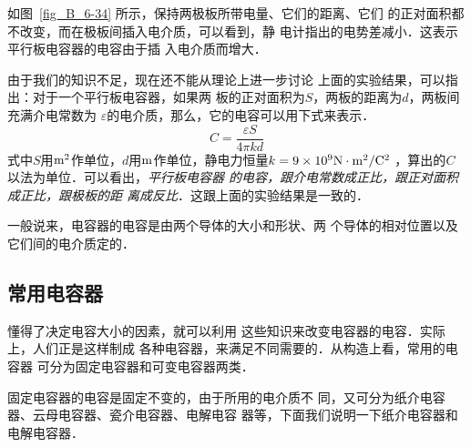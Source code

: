     如图~\ref{fig_B_6-34} 所示，保持两极板所带电量、它们的距离、它们
    的正对面积都不改变，而在极板间插入电介质，可以看到，静
    电计指出的电势差减小．这表示平行板电容器的电容由于插
    入电介质而增大．

    由于我们的知识不足，现在还不能从理论上进一步讨论
    上面的实验结果，可以指出：对于一个平行板电容器，如果两
    板的正对面积为$S$，两板的距离为$d$，两板间充满介电常数为
    $\varepsilon$的电介质，那么，它的电容可以用下式来表示．
\[C=\frac{\varepsilon S}{4\pi kd} \]
式中$S$用${\rm m^2}$作单位，$d$用${\rm m}$作单位，静电力恒量$k=9\times 10^9{\rm N}\cdot {\rm m^2}/{\rm C^2}$
，算出的$C$以法为单位．可以看出，\textit{平行板电容器
的电容，跟介电常数成正比，跟正对面积成正比，跟极板的距
离成反比}．这跟上面的实验结果是一致的．

一般说来，电容器的电容是由两个导体的大小和形状、两
个导体的相对位置以及它们间的电介质定的．

\subsection{常用电容器}

懂得了决定电容大小的因素，就可以利用
这些知识来改变电容器的电容．实际上，人们正是这样制成
各种电容器，来满足不同需要的．从构造上看，常用的电容器
可分为固定电容器和可变电容器两类．

固定电容器的电容是固定不变的，由于所用的电介质不
同，又可分为纸介电容器、云母电容器、瓷介电容器、电解电容
器等，下面我们说明一下纸介电容器和电解电容器．


